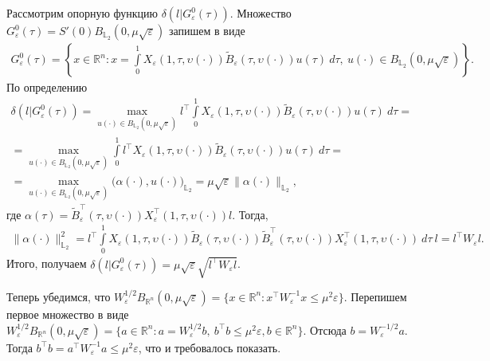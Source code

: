 \documentclass[../main.tex]{subfiles}
\begin{document}
Рассмотрим опорную функцию $\delta(l | G^0_{\varepsilon}(\tau))$. 
Множество $G^0_{\varepsilon}(\tau) = S'(0) B_{\mathbb{L}_2}(0,\mu\sqrt{\varepsilon})$  запишем в виде 
\begin{gather*}
	G^0_{\varepsilon}(\tau)  = \left\{ x \in \mathbb{R}^n: x = \int\limits_0^1  X_{\varepsilon}(1, \tau, \upsilon(\cdot)) \widetilde{B}_{\varepsilon}(\tau, \upsilon(\cdot))  u(\tau)\ d\tau, \ u(\cdot) \in B_{\mathbb{L}_2}(0,\mu\sqrt{\varepsilon}) \right\}.
\end{gather*} 
По определению
\begin{gather*}
	\delta(l | G^0_{\varepsilon}(\tau)) = \max\limits_{u(\cdot) \in B_{\mathbb{L}_2}(0,\mu\sqrt{\varepsilon})} l^{\top} \int\limits_0^1  X_{\varepsilon}(1, \tau, \upsilon(\cdot)) \widetilde{B}_{\varepsilon}(\tau, \upsilon(\cdot))  u(\tau)\ d\tau = \\ =
	\max\limits_{u(\cdot) \in B_{\mathbb{L}_2}(0,\mu\sqrt{\varepsilon})}  \int\limits_0^1  l^{\top} X_{\varepsilon}(1, \tau, \upsilon(\cdot)) \widetilde{B}_{\varepsilon}(\tau, \upsilon(\cdot))  u(\tau)\ d\tau  =\\=
	 \max\limits_{u(\cdot) \in B_{\mathbb{L}_2}(0,\mu\sqrt{\varepsilon})} \Big(\alpha(\cdot) , u(\cdot)\Big)_{\mathbb{L}_2} =
	 \mu\sqrt{\varepsilon} \| \alpha(\cdot)\|_{\mathbb{L}_2},
\end{gather*}
где $ \alpha(\tau) = \widetilde{B}^{\top}_{\varepsilon}(\tau, \upsilon(\cdot)) X^{\top}_{\varepsilon}(1, \tau, \upsilon(\cdot)) l$. 
Тогда,
\begin{gather*}
	\| \alpha(\cdot)\|^2_{\mathbb{L}_2} = l^{\top} \int\limits_0^1 X_{\varepsilon}(1, \tau, \upsilon(\cdot)) \widetilde{B}_{\varepsilon}(\tau, \upsilon(\cdot))  \widetilde{B}^{\top}_{\varepsilon}(\tau, \upsilon(\cdot)) X^{\top}_{\varepsilon}(1, \tau, \upsilon(\cdot)) \ d\tau \ l = l^{\top} W_{\varepsilon} l.
\end{gather*}
Итого, получаем $\delta(l | G^0_{\varepsilon}(\tau)) =  \mu\sqrt{\varepsilon} \sqrt{l^{\top} W_{\varepsilon} l}  $.

Теперь убедимся, что  $W^{1/2}_{\varepsilon} B_{\mathbb{R}^n}(0,\mu\sqrt{\varepsilon}) = \{ x \in \mathbb{R}^n: x^{\top} W^{-1}_{\varepsilon} x \leqslant \mu^2 \varepsilon \} $.
Перепишем первое множество в виде $ W^{1/2}_{\varepsilon} B_{\mathbb{R}^n}(0,\mu\sqrt{\varepsilon}) = \{ a \in \mathbb{R}^n: a = W^{1/2}_{\varepsilon} b, \ b^{\top} b  \leqslant \mu^2 \varepsilon, b \in \mathbb{R}^n \} $. 
Отсюда $b = W^{-1/2}_{\varepsilon} a $.
Тогда $ b^{\top} b = a^{\top} W^{-1}_{\varepsilon} a \leqslant \mu^2 \varepsilon $, что и требовалось показать.
\end{document}
